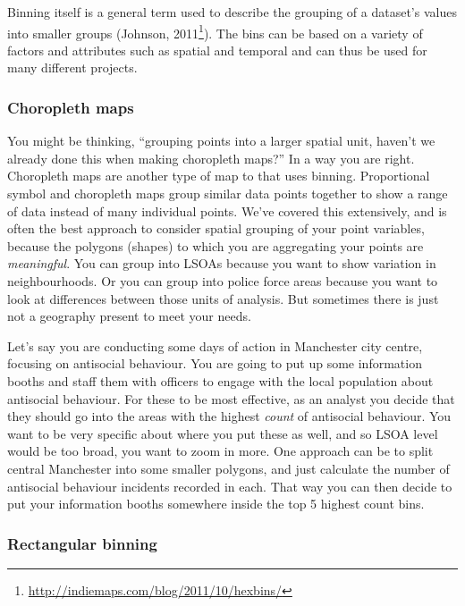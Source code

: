 \documentclass[
  krantz2]{krantz}
\renewcommand{\href}[2]{#2\footnote{\url{#1}}}
\begin{document}
Binning itself is a general term used to describe the grouping of a dataset's values into smaller groups (\href{http://indiemaps.com/blog/2011/10/hexbins/}{Johnson, 2011}). The bins can be based on a variety of factors and attributes such as spatial and temporal and can thus be used for many different projects.

\hypertarget{choropleth-maps-1}{%
\subsubsection{Choropleth maps}\label{choropleth-maps-1}}

You might be thinking, ``grouping points into a larger spatial unit, haven't we already done this when making choropleth maps?'' In a way you are right. Choropleth maps are another type of map to that uses binning. Proportional symbol and choropleth maps group similar data points together to show a range of data instead of many individual points. We've covered this extensively, and is often the best approach to consider spatial grouping of your point variables, because the polygons (shapes) to which you are aggregating your points are \emph{meaningful}. You can group into LSOAs because you want to show variation in neighbourhoods. Or you can group into police force areas because you want to look at differences between those units of analysis. But sometimes there is just not a geography present to meet your needs.

Let's say you are conducting some days of action in Manchester city centre, focusing on antisocial behaviour. You are going to put up some information booths and staff them with officers to engage with the local population about antisocial behaviour. For these to be most effective, as an analyst you decide that they should go into the areas with the highest \emph{count} of antisocial behaviour. You want to be very specific about where you put these as well, and so LSOA level would be too broad, you want to zoom in more. One approach can be to split central Manchester into some smaller polygons, and just calculate the number of antisocial behaviour incidents recorded in each. That way you can then decide to put your information booths somewhere inside the top 5 highest count bins.

\hypertarget{rectangular-binning}{%
\subsubsection{Rectangular binning}\label{rectangular-binning}}
\end{document}
